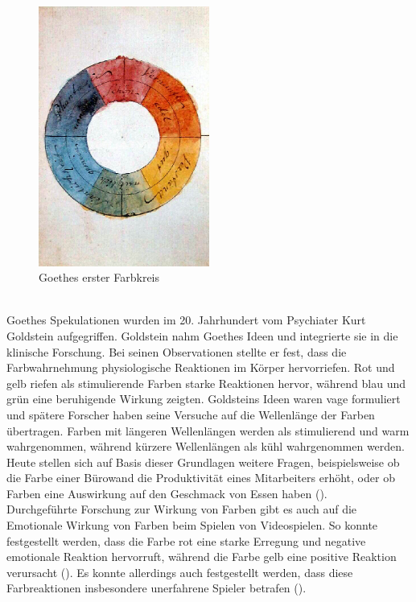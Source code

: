 \documentclass[./dokumentation.tex]{subfiles}
\begin{document}
\begin{figure}[h]
    \centering
    \includegraphics[width=0.5\textwidth]{bilder/goethe.jpg}
    \caption{Goethes erster Farbkreis \cite{goethe1809}}
    \label{fig8:goethe}
\end{figure}\\

Goethes Spekulationen wurden im 20. Jahrhundert vom Psychiater Kurt Goldstein aufgegriffen. Goldstein nahm Goethes Ideen und integrierte sie in die klinische Forschung. Bei seinen Observationen stellte er fest, dass die Farbwahrnehmung physiologische Reaktionen im Körper hervorriefen. Rot und gelb riefen als stimulierende Farben starke Reaktionen hervor, während blau und grün eine beruhigende Wirkung zeigten. Goldsteins Ideen waren vage formuliert und spätere Forscher haben seine Versuche auf die Wellenlänge der Farben übertragen. Farben mit längeren Wellenlängen werden als stimulierend und warm wahrgenommen, während kürzere Wellenlängen als kühl wahrgenommen werden. \\

Heute stellen sich auf Basis dieser Grundlagen weitere Fragen, beispielsweise ob die Farbe einer Bürowand die Produktivität eines Mitarbeiters erhöht, oder ob Farben eine Auswirkung auf den Geschmack von Essen haben (\cite{elliot2004}).\\

Durchgeführte Forschung zur Wirkung von Farben gibt es auch auf die Emotionale Wirkung von Farben beim Spielen von Videospielen. So konnte festgestellt werden, dass die Farbe rot eine starke Erregung und negative emotionale Reaktion hervorruft, während die Farbe gelb eine positive Reaktion verursacht (\cite{joosten}). Es konnte allerdings auch festgestellt werden, dass diese Farbreaktionen insbesondere unerfahrene Spieler betrafen (\cite{joosten}).\\
\end{document}
